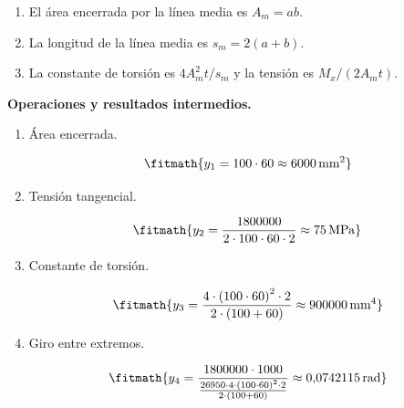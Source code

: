 \begin{enumerate}

\item El área encerrada por la línea media es $A_m = a b$.

\item La longitud de la línea media es $s_m = 2(a + b)$.

\item La constante de torsión es $4 A_m^2 t/s_m$ y la tensión es $M_x/(2 A_m t)$.

\end{enumerate}

\noindent\textbf{Operaciones y resultados intermedios.}

\begin{enumerate}

\item Área encerrada.

\[\fitmath{y_{1}=100\cdot 60\approx 6000\,\mathrm{mm^{2}}}\]

\item Tensión tangencial.

\[\fitmath{y_{2}=\frac{1800000}{2\cdot 100\cdot 60\cdot 2}\approx 75\,\mathrm{MPa}}\]

\item Constante de torsión.

\[\fitmath{y_{3}=\frac{4\cdot {\left(100\cdot 60\right)}^{2}\cdot 2}{2\cdot \left(100+60\right)}\approx 900000\,\mathrm{mm^{4}}}\]

\item Giro entre extremos.

\[\fitmath{y_{4}=\frac{1800000\cdot 1000}{\frac{26950\cdot 4\cdot {\left(100\cdot 60\right)}^{2}\cdot 2}{2\cdot \left(100+60\right)}}\approx 0{,}0742115\,\mathrm{rad}}\]

\end{enumerate}
